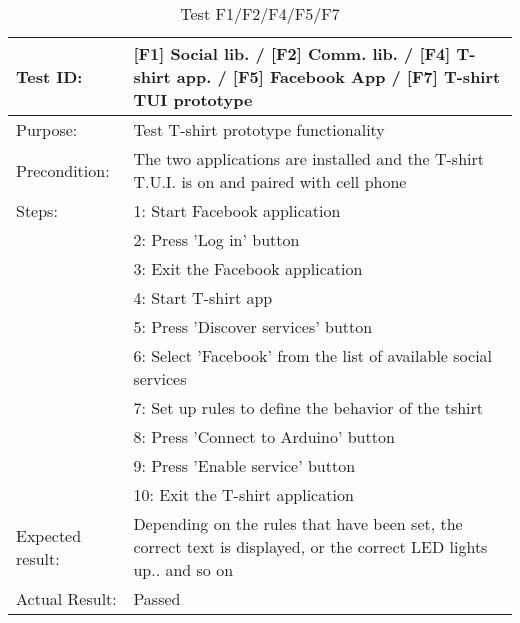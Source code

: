 \begin{table}[h!]
\begin{tabular}{|l|p{10cm}|}
\hline Test ID: &		[F1] Social lib. / [F2] Comm. lib. / [F4] T-shirt app. /
						[F5] Facebook App / [F7] T-shirt TUI prototype \\
\hline Purpose: &		Test T-shirt prototype functionality \\
\hline Precondition: &	The two applications are installed and the T-shirt T.U.I.
						is on and paired with cell phone \\
\hline
Steps:
  & 1: Start Facebook application \\
  & 2: Press 'Log in' button \\
  & 3: Exit the Facebook application \\
  & 4: Start T-shirt app \\
  & 5: Press 'Discover services' button \\
  & 6: Select 'Facebook' from the list of available social services \\
  & 7: Set up rules to define the behavior of the tshirt \\
  & 8: Press 'Connect to Arduino' button \\
  & 9: Press 'Enable service' button \\
  &10: Exit the T-shirt application \\
\hline
Expected result:
   & Depending on the rules that have been set, the correct text is displayed,
   or the correct LED lights up.. and so on \\
\hline
Actual Result:
  &  Passed \\
\hline
\end{tabular}
\caption{Test F1/F2/F4/F5/F7}
\label{tbl:f1f2f4f5f7test}
\end{table}

